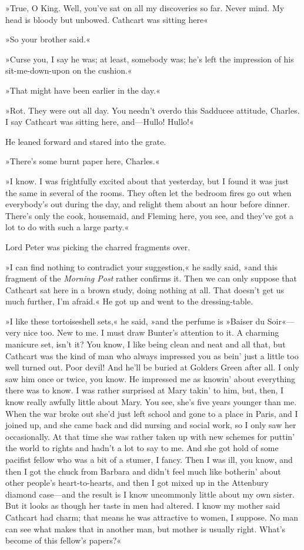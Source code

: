 »True, O King. Well, you've sat on all my discoveries so far. Never mind. My head is bloody but unbowed. Cathcart was sitting here\longdash«

»So your brother said.«

»Curse you, I say he was; at least, somebody was; he's left the impression of his sit-me-down-upon on the cushion.«

»That might have been earlier in the day.«

»Rot. They were out all day. You needn't overdo this Sadducee attitude, Charles. I say Cathcart was sitting here, and—Hullo! Hullo!«

He leaned forward and stared into the grate.

»There's some burnt paper here, Charles.«

»I know. I was frightfully excited about that yesterday, but I found it was just the same in several of the rooms. They often let the bedroom fires go out when everybody's out during the day, and relight them about an hour before dinner. There's only the cook, housemaid, and Fleming here, you see, and they've got a lot to do with such a large party.«

Lord Peter was picking the charred fragments over.

»I can find nothing to contradict your suggestion,« he sadly said, »and this fragment of the \textit{Morning Post} rather confirms it. Then we can only suppose that Cathcart sat here in a brown study, doing nothing at all. That doesn't get us much further, I'm afraid.« He got up and went to the dressing-table.

»I like these tortoiseshell sets,« he said, »and the perfume is »Baiser du Soir«—very nice too. New to me. I must draw Bunter's attention to it. A charming manicure set, isn't it? You know, I like being clean and neat and all that, but Cathcart was the kind of man who always impressed you as bein' just a little too well turned out. Poor devil! And he'll be buried at Golders Green after all. I only saw him once or twice, you know. He impressed me as knowin' about everything there was to know. I was rather surprised at Mary takin' to him, but, then, I know really awfully little about Mary. You see, she's five years younger than me. When the war broke out she'd just left school and gone to a place in Paris, and I joined up, and she came back and did nursing and social work, so I only saw her occasionally. At that time she was rather taken up with new schemes for puttin' the world to rights and hadn't a lot to say to me. And she got hold of some pacifist fellow who was a bit of a stumer, I fancy. Then I was ill, you know, and then I got the chuck from Barbara and didn't feel much like botherin' about other people's heart-to-hearts, and then I got mixed up in the Attenbury diamond case—and the result is I know uncommonly little about my own sister. But it looks as though her taste in men had altered. I know my mother said Cathcart had charm; that means he was attractive to women, I suppose. No man can see what makes that in another man, but mother is usually right. What's become of this fellow's papers?«

